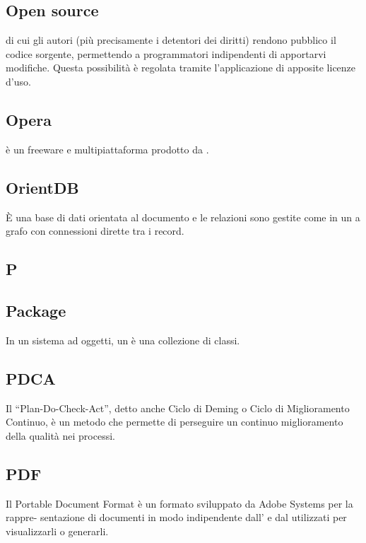 \subsection{Open source}
 di cui gli autori (più precisamente i detentori dei diritti) rendono pubblico
il codice sorgente, permettendo a programmatori indipendenti di apportarvi modifiche.
Questa possibilità è regolata tramite l'applicazione di apposite licenze d'uso.

\subsection{Opera}
 è un   freeware e multipiattaforma prodotto da  .

\subsection{OrientDB}
È una base di dati orientata al documento e le relazioni sono gestite come in un  a grafo con connessioni dirette tra i record.

\newpage

\begin{center}
\Huge\section{\uppercase{P}}
\end{center}

\subsection{Package}
In un sistema ad oggetti, un  è una collezione di classi.

\subsection{PDCA}
Il “Plan-Do-Check-Act”, detto anche Ciclo di Deming o Ciclo di Miglioramento Continuo,
è un metodo che permette di perseguire un continuo miglioramento della qualità nei processi.

\subsection{PDF}
Il Portable Document Format è un formato sviluppato da Adobe Systems per la rappre-
sentazione di documenti in modo indipendente dall’ e dal  utilizzati per
visualizzarli o generarli.

